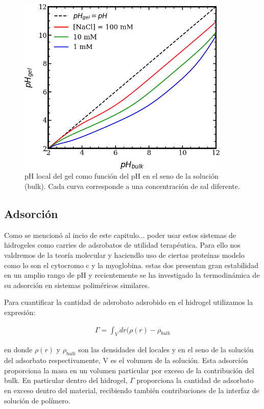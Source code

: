 \begin{figure}
    \centering
    \includegraphics[width=0.9\textwidth]{Figures/graph-film/pH-local.png}
    \caption{pH local del gel como funci\'on del pH en el seno de la soluci\'on (bulk). Cada curva corresponde a una concentraci\'on de sal diferente.}
    \label{fig:pH-local}
\end{figure}

\subsection{Adsorci\'on}
Como se mencion\'o al incio de este capitulo... poder usar estos sistemas de hidrogeles como carries de adsrobatos de utilidad terap\'eutica.
Para ello nos valdremos de la teor\'ia molecular y haciendlo uso de ciertas prote\'inas modelo como lo son el cytocromo c y la myoglobina. estas dos presentan gran estabilidad en un amplio rango de pH y recientemente se ha  investigado la termodinámica  de su adsorci\'on en sistemas polim\'ericos similares. \addcite

Para cuantificar la cantidad de adsrobato adsrobido en el hidrogel utilizamos la expresi\'on:

\begin{align}
\Gamma = \int_V {dr(\rho(r) -\rho_{bulk}}  
\label{adsor}
\end{align}

en donde $\rho(r)$ y $\rho_{bulk}$ son las densidades del  locales y en el seno de la soluci\'on del adsorbato respectivamente, V es el volumen de la soluci\'on. 
Esta adsorción proporciona la masa  en un volumen particular por exceso de la contribución del bulk. En particular dentro del hidrogel, $\Gamma$ proporciona la cantidad de adsorbato en exceso dentro del material, recibiendo también contribuciones de la interfaz de solución de polímero.


